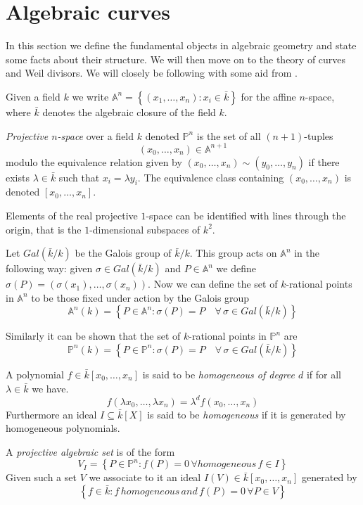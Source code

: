 
\section{Algebraic curves}
In this section we define the fundamental objects in algebraic geometry and state
some facts about their structure. We will then move on to the theory of
curves and Weil divisors. We will closely be following \cite{AEC} with some aid from
\cite{Fulton}.

Given a field $k$ we write $\mathbb{A}^n = \left\{ (x_1,\ldots,x_n) : x_i\in \bar{k}\right\}$ for the
affine $n$-space, where $\bar{k}$ denotes the algebraic closure of the field $k$.

\begin{mydef}
\emph{Projective $n$-space} over a field $k$ denoted $\mathbb{P}^n$ is the set 
of all $(n+1)$-tuples $$(x_0,\ldots,x_n)\in\mathbb{A}^{n+1}$$
modulo the equivalence relation given by $(x_0,\ldots,x_n)\sim(y_0,\ldots,y_n)$ 
if there exists $\lambda\in \bar{k}$ such that $x_i=\lambda y_i$.
The equivalence class containing $(x_0, \ldots, x_n)$ is denoted $[x_0,\ldots,x_n]$.
\end{mydef}
Elements of the real projective $1$-space can be identified with lines through the origin, that is the
$1$-dimensional subspaces of $k^2$.

Let $Gal(\bar{k}/k)$ be the Galois group of $\bar{k}/k$. This group acts on
$\mathbb{A}^n$ in the following way: given $\sigma \in Gal(\bar{k}/k)$ and $P\in \mathbb{A}^n$
we define $\sigma(P) = (\sigma(x_1),\ldots,\sigma(x_n))$. Now we can define
the set of $k$-rational points in $\mathbb{A}^n$ to be those fixed under action by
the Galois group
$$ \mathbb{A}^n(k) = \left\{ P \in \mathbb{A}^n : \sigma(P) = P\quad \forall\, \sigma \in
Gal(\bar{k}/k) \right\} $$

Similarly it can be shown that the set of $k$-rational points in $\mathbb{P}^n$ are
$$ \mathbb{P}^n(k) = \left\{ P \in \mathbb{P}^n : \sigma(P) = P\quad \forall\, \sigma \in 
Gal(\bar{k}/k) \right\} $$

\begin{mydef}
 A polynomial $f\in\bar{k}[x_0,\ldots,x_n]$ is said to be \emph{homogeneous of degree $d$} if for all
$\lambda\in\bar{k}$ we have.
$$f(\lambda x_0,\ldots,\lambda x_n) = \lambda^d f(x_0,\ldots,x_n)$$
Furthermore an ideal $I\subseteq\bar{k}[X]$ is said to be \emph{homogeneous} if it is generated
by homogeneous polynomials.
\end{mydef}

\begin{mydef}
 A \emph{projective algebraic set} is of the form
$$ V_I = \left\{ P\in \mathbb{P}^n : f(P) = 0\, \forall homogeneous\, f\in I \right\} $$
Given such a set $V$ we associate to it an ideal $I(V) \in \bar{k}[x_0,\ldots, x_n]$ generated by
$$ \left\{f\in\bar{k} : f\, homogeneous\, and\, f(P)=0\, \forall P\in V \right\} $$
\end{mydef}

